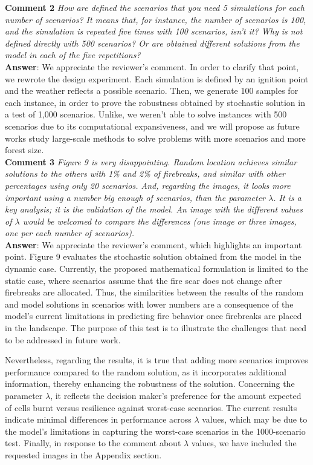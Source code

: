 \documentclass[12pt]{article}
\begin{document}
\noindent \textbf{Comment 2} \textit{How are defined the scenarios that you need 5 simulations for each number of scenarios? It means that, for instance, the number of scenarios is 100, and the simulation is repeated five times with 100 scenarios, isn’t it? Why is not defined directly with 500 scenarios? Or are obtained different solutions from the model in each of the five repetitions?}\\

\textbf{Answer}: We appreciate the reviewer's comment. In order to clarify that point, we rewrote the design experiment.  Each simulation is defined by an ignition point and the weather  reflects a possible scenario. Then, we generate 100 samples for each instance, in order to prove the robustness obtained by stochastic solution in a test of 1,000 scenarios. Unlike, we weren't able to solve instances with 500 scenarios due to its computational expansiveness, and we will propose as future works study large-scale methods to solve problems with more scenarios and more forest size. \\

\noindent \textbf{Comment 3} \textit{Figure 9 is very disappointing. Random location achieves similar solutions to the others with 1\% and 2\% of firebreaks, and similar with other percentages using only 20 scenarios. And, regarding the images, it looks more important using a number big enough of scenarios, than the parameter $\lambda$. It is a key analysis; it is the validation of the model. An image with the different values of $\lambda$ would be welcomed to compare the differences (one image or three images, one per each number of scenarios).}\\

\textbf{Answer}: We appreciate the reviewer’s comment, which highlights an important point. Figure 9 evaluates the stochastic solution obtained from the model in the dynamic case. Currently, the proposed mathematical formulation is limited to the static case, where scenarios assume that the fire scar does not change after firebreaks are allocated. Thus, the similarities between the results of the random and model solutions in scenarios with lower numbers are a consequence of the model’s current limitations in predicting fire behavior once firebreaks are placed in the landscape. The purpose of this test is to illustrate the challenges that need to be addressed in future work. 

Nevertheless, regarding the results, it is true that adding more scenarios improves performance compared to the random solution, as it incorporates additional information, thereby enhancing the robustness of the solution. Concerning the parameter $\lambda$, it reflects the decision maker’s preference for the amount expected of cells burnt versus resilience against worst-case scenarios. The current results indicate minimal differences in performance across $\lambda$ values, which may be due to the model’s limitations in capturing the worst-case scenarios in the 1000-scenario test. Finally, in response to the comment about $\lambda$ values, we have included the requested images in the Appendix section. \\
\end{document}
